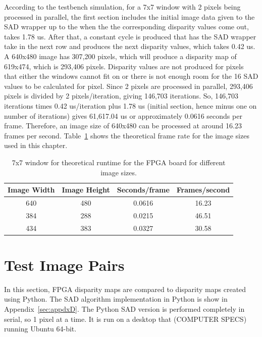 According to the testbench simulation, for a 7x7 window with 2 pixels being processed in parallel, the first section includes the initial image data given to the SAD wrapper up to the when the the corresponding disparity values come out, takes 1.78 us. After that, a constant cycle is produced that has the SAD wrapper take in the next row and produces the next disparity values, which takes 0.42 us. A 640x480 image has 307,200 pixels, which will produce a disparity map of 619x474, which is 293,406 pixels. Disparity values are not produced for pixels that either the windows cannot fit on or there is not enough room for the 16 SAD values to be calculated for pixel. Since 2 pixels are processed in parallel, 293,406 pixels is divided by 2 pixels/iteration, giving 146,703 iterations. So, 146,703 iterations times 0.42 us/iteration plus 1.78 us (initial section, hence minus one on number of iterations) gives 61,617.04 us or approximately 0.0616 seconds per frame. Therefore, an image size of 640x480 can be processed at around 16.23 frames per second. Table~\ref{table:tb_7x7} shows the theoretical frame rate for the image sizes used in this chapter.


\begin{table}
	\begin{center}
		\begin{tabular}{|c|c|c|c|}
			\hline 
				\rowstyle{\bfseries} Image Width & 
				\rowstyle{\bfseries} Image Height & 
				\rowstyle{\bfseries} Seconds/frame & 
				\rowstyle{\bfseries} Frames/second
			\\ \hline 
			640 & 480 & 0.0616 & 16.23
			\\ \hline 
			384 & 288 & 0.0215 & 46.51
			\\ \hline 
			434 & 383 & 0.0327 & 30.58
			\\ \hline 
		\end{tabular}	
		\captionfonts
		\caption{7x7 window for theoretical runtime for the FPGA board for different image sizes.}
		\label{table:tb_7x7}
	\end{center}
\end{table}

\section{Test Image Pairs}
\label{sec:runtime}

In this section, FPGA disparity maps are compared to disparity maps created using Python. The SAD algorithm implementation in Python is show in Appendix~\ref{sec:appdxD}. The Python SAD version is performed completely in serial, so 1 pixel at a time. It is run on a desktop that (COMPUTER SPECS) running Ubuntu 64-bit.

